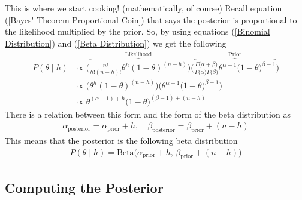 \documentclass[12pt,twoside]{report}   %
\begin{document}
This is where we start cooking! (mathematically, of course) Recall equation (\ref{Bayes' Theorem Proportional Coin}) that says the posterior is proportional to the likelihood multiplied by the prior. So, by using equations (\ref{Binomial Distribution}) and (\ref{Beta Distribution}) we get the following
\begin{align*}
P(\theta\mid h) &\propto \bigg(\overbrace{\frac{n!}{h!(n - h)!}\theta^h(1 - \theta)^{(n-h)}}^\text{Likelihood}\bigg)\bigg(\overbrace{\frac{\Gamma\big(\alpha + \beta\big)}{\Gamma\big(\alpha\big)\Gamma\big(\beta\big)}\theta^{\alpha - 1}\big(1 - \theta\big)^{\beta - 1}}^\text{Prior}\bigg)\\
&\propto \Big(\theta^h(1 - \theta)^{(n-h)}\Big)\Big(\theta^{\alpha - 1}\big(1 - \theta\big)^{\beta - 1}\Big)\\
&\propto \theta^{(\alpha - 1) + h}\big(1 - \theta\big)^{(\beta - 1) + (n - h)}
\end{align*}
There is a relation between this form and the form of the beta distribution as
\begin{align*}
\alpha_\text{posterior} = \alpha_\text{prior} + h,\quad\beta_\text{posterior} = \beta_\text{prior} + (n - h)
\end{align*}
This means that the posterior is the following beta distribution
\begin{align*}
P(\theta\mid h) = \text{Beta}\big(\alpha_\text{prior} + h,\,\beta_\text{prior} + (n - h)\big)
\end{align*}

\subsection{Computing the Posterior}\label{Computing the Posterior}
\end{document}
